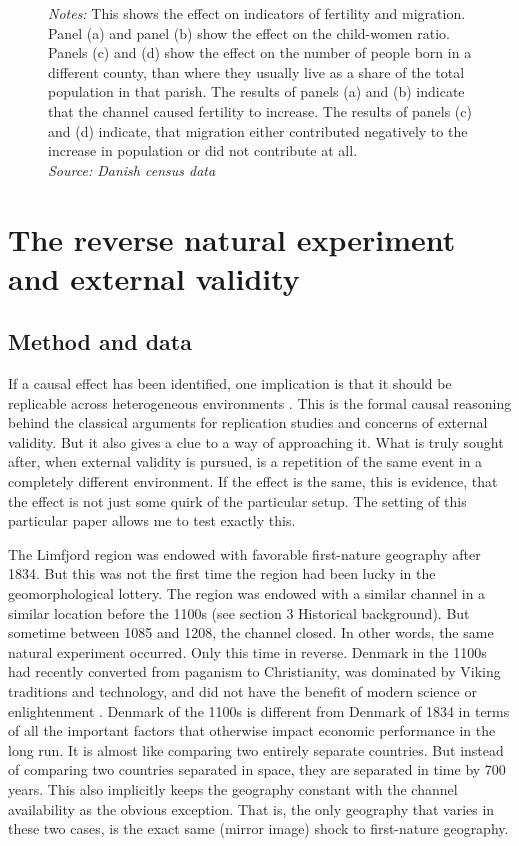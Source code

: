 \documentclass[11pt]{article}
\begin{document}
\begin{figure}
\begin{subfigure}[b]{0.45\textwidth}
    \end{subfigure}
    \parbox{0.9\textwidth}{
    \caption*{\footnotesize \textit{Notes:} This shows the effect on indicators of fertility and migration. Panel (a) and panel (b) show the effect on the child-women ratio. Panels (c) and (d) show the effect on the number of people born in a different county, than where they usually live as a share of the total population in that parish. The results of panels (a) and (b) indicate that the channel caused fertility to increase. The results of panels (c) and (d) indicate, that migration either contributed negatively to the increase in population or did not contribute at all.  \\ \textit{Source: Danish census data}}
}
    \label{fig:migr_fert}
\end{figure}

\FloatBarrier

\section{The reverse natural experiment and external validity}

\subsection{Method and data}
If a causal effect has been identified, one implication is that it should be replicable across heterogeneous environments \citep{Peters2016}. This is the formal causal reasoning behind the classical arguments for replication studies and concerns of external validity. But it also gives a clue to a way of approaching it. What is truly sought after, when external validity is pursued, is a repetition of the same event in a completely different environment. If the effect is the same, this is evidence, that the effect is not just some quirk of the particular setup. The setting of this particular paper allows me to test exactly this. 

The Limfjord region was endowed with favorable first-nature geography after 1834. But this was not the first time the region had been lucky in the geomorphological lottery. The region was endowed with a similar channel in a similar location before the 1100s (see section 3 Historical background). But sometime between 1085 and 1208, the channel closed. In other words, the same natural experiment occurred. Only this time in reverse. Denmark in the 1100s had recently converted from paganism to Christianity, was dominated by Viking traditions and technology, and did not have the benefit of modern science or enlightenment \citep{Roesdahl2022, milkandbutter}. Denmark of the 1100s is different from Denmark of 1834 in terms of all the important factors that otherwise impact economic performance in the long run. It is almost like comparing two entirely separate countries. But instead of comparing two countries separated in space, they are separated in time by 700 years. This also implicitly keeps the geography constant with the channel availability as the obvious exception. That is, the only geography that varies in these two cases, is the exact same (mirror image) shock to first-nature geography. 
\end{document}
